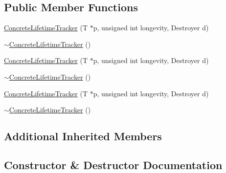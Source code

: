 \subsection*{Public Member Functions}
\begin{DoxyCompactItemize}
\item 
\mbox{\hyperlink{classUtil_1_1Private_1_1ConcreteLifetimeTracker_a57e26a2e72542caf98f691f0972718d1}{Concrete\+Lifetime\+Tracker}} (T $\ast$p, unsigned int longevity, Destroyer d)
\item 
\mbox{\hyperlink{classUtil_1_1Private_1_1ConcreteLifetimeTracker_a46aa326f024ef9d7301b84af803c5fb0}{$\sim$\+Concrete\+Lifetime\+Tracker}} ()
\item 
\mbox{\hyperlink{classUtil_1_1Private_1_1ConcreteLifetimeTracker_a57e26a2e72542caf98f691f0972718d1}{Concrete\+Lifetime\+Tracker}} (T $\ast$p, unsigned int longevity, Destroyer d)
\item 
\mbox{\hyperlink{classUtil_1_1Private_1_1ConcreteLifetimeTracker_a46aa326f024ef9d7301b84af803c5fb0}{$\sim$\+Concrete\+Lifetime\+Tracker}} ()
\item 
\mbox{\hyperlink{classUtil_1_1Private_1_1ConcreteLifetimeTracker_a57e26a2e72542caf98f691f0972718d1}{Concrete\+Lifetime\+Tracker}} (T $\ast$p, unsigned int longevity, Destroyer d)
\item 
\mbox{\hyperlink{classUtil_1_1Private_1_1ConcreteLifetimeTracker_a46aa326f024ef9d7301b84af803c5fb0}{$\sim$\+Concrete\+Lifetime\+Tracker}} ()
\end{DoxyCompactItemize}
\subsection*{Additional Inherited Members}


\subsection{Constructor \& Destructor Documentation}
\mbox{\label{classUtil_1_1Private_1_1ConcreteLifetimeTracker_a57e26a2e72542caf98f691f0972718d1}} 
